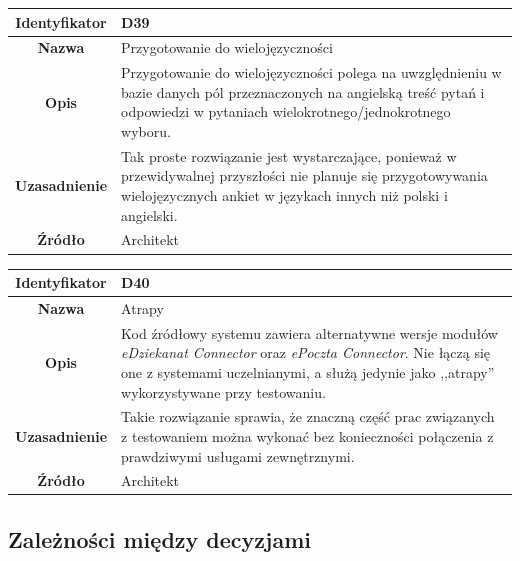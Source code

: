 \begin{table}[H]
\centering
\begin{tabular}{ | >{\bfseries}c | p{11cm} | }
\hline
%
Identyfikator & D39 \\ \hline
Nazwa & Przygotowanie do wielojęzyczności \\ \hline
Opis & Przygotowanie do wielojęzyczności polega na uwzględnieniu w bazie danych pól przeznaczonych na angielską treść pytań i odpowiedzi w pytaniach wielokrotnego/jednokrotnego wyboru. \\ \hline
Uzasadnienie & Tak proste rozwiązanie jest wystarczające, ponieważ w przewidywalnej przyszłości nie planuje się przygotowywania wielojęzycznych ankiet w językach innych niż polski i angielski. \\ \hline
Źródło & Architekt \\ \hline
%
\end{tabular}
\end{table}

\begin{table}[H]
\centering
\begin{tabular}{ | >{\bfseries}c | p{11cm} | }
\hline
%
Identyfikator & D40 \\ \hline
Nazwa & Atrapy \\ \hline
Opis & Kod źródłowy systemu zawiera alternatywne wersje modułów \textit{eDziekanat Connector} oraz \textit{ePoczta Connector}. Nie łączą się one z systemami uczelnianymi, a służą jedynie jako ,,atrapy'' wykorzystywane przy testowaniu. \\ \hline
Uzasadnienie &  Takie rozwiązanie sprawia, że znaczną część prac związanych z testowaniem można wykonać bez konieczności połączenia z prawdziwymi usługami zewnętrznymi. \\ \hline
Źródło & Architekt \\ \hline
%
\end{tabular}
\end{table}

\subsection{Zależności między decyzjami}
\label{Chapter553}

